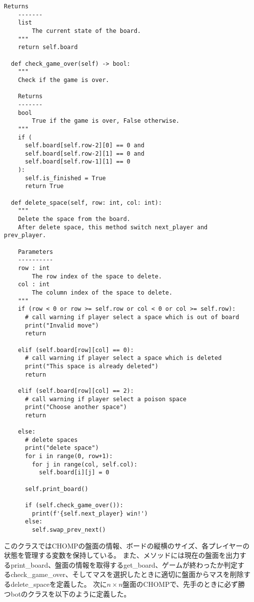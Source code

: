 \documentclass[uplatex,dvipdfmx,a4paper,10pt]{jsarticle}
\theoremstyle{definition}
\begin{document}
\begin{lstlisting}[caption={CHOMPゲームのクラス}]
    Returns
    -------
    list
        The current state of the board.
    """
    return self.board

  def check_game_over(self) -> bool:
    """
    Check if the game is over.
    
    Returns
    -------
    bool
        True if the game is over, False otherwise.
    """
    if (
      self.board[self.row-2][0] == 0 and
      self.board[self.row-2][1] == 0 and
      self.board[self.row-1][1] == 0
    ):
      self.is_finished = True
      return True

  def delete_space(self, row: int, col: int):
    """
    Delete the space from the board.
    After delete space, this method switch next_player and prev_player.
    
    Parameters
    ----------
    row : int
        The row index of the space to delete.
    col : int
        The column index of the space to delete.
    """
    if (row < 0 or row >= self.row or col < 0 or col >= self.row):
      # call warning if player select a space which is out of board
      print("Invalid move")
      return
    
    elif (self.board[row][col] == 0):
      # call warning if player select a space which is deleted
      print("This space is already deleted")
      return
    
    elif (self.board[row][col] == 2):
      # call warning if player select a poison space
      print("Choose another space")
      return
    
    else:
      # delete spaces
      print("delete space")
      for i in range(0, row+1):
        for j in range(col, self.col):
          self.board[i][j] = 0

      self.print_board()

      if (self.check_game_over()):
        print(f'{self.next_player} win!')
      else:
        self.swap_prev_next()
\end{lstlisting}

このクラスではCHOMPの盤面の情報、ボードの縦横のサイズ、各プレイヤーの状態を管理する変数を保持している。
また、メソッドには現在の盤面を出力するprint\_board、盤面の情報を取得するget\_board、ゲームが終わったか判定するcheck\_game\_over、そしてマスを選択したときに適切に盤面からマスを削除するdelete\_spaceを定義した。
次に\(n \times n\)盤面のCHOMPで、先手のときに必ず勝つbotのクラスを以下のように定義した。
\end{document}
